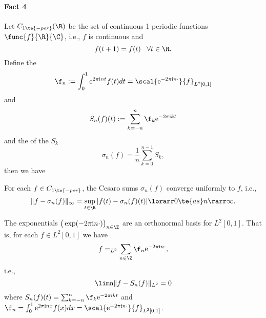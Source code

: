 \paragraph{Fact 4}
Let $C_{1\te{-per}}(\R)$ be the set of continuous 1-periodic functions $\func{f}{\R}{\C}$, i.e., $f$ is continuous and
\[f(t+1)=f(t)\;\;\;\forall t\in \R.\]
Define the 
\[\f_n:=\int_0^1\mathrm{e}^{2\pi \mathrm{i} n t}f(t)dt=\scal{\mathrm{e}^{-2\pi \mathrm{i}n\cdot}}{f}_{L^2[0,1]}\]
and 
\[S_n(f)(t):=\sum_{k=-n}^n\f_k\mathrm{e}^{-2\pi \mathrm{i} kt}\]
and the  of the $S_k$
\[\sigma_n(f)=\frac{1}{n}\sum_{k=0}^{n-1}S_k,\]
then we have
\begin{thm}[Fejér]\label{ii.23}
    For each $f\in C_{1\te{-per}}$, the Cesaro sums $\sigma_n(f)$ converge uniformly to $f$, i.e., 
    \[\|f-\sigma_n(f)\|_\infty=\sup_{t\in\R}|f(t)-\sigma_n(f)(t)|\lorarr0\te{ as }n\rarr\infty.\]
\end{thm}

\begin{thm}\label{ii.24}
    The exponentials $\big(\exp(-2\pi \mathrm{i}n\cdot)\big)_{n\in\Z}$ are an orthonormal basis for $L^2[0,1]$. That is, for each $f\in L^2[0,1]$ we have
    \[f=_{L^2}\sum_{n\in\Z}\f_n\mathrm{e}^{-2\pi  \mathrm{i} n\cdot},\]
    i.e., 
    \[\limn\|f-S_n(f)\|_{L^2}=0\]
    where $S_n(f)(t)=\sum_{k=-n}^n\f_k\mathrm{e}^{-2\pi \mathrm{i} kt}$ and $\f_n=\int_0^1\mathrm{e}^{2\pi \mathrm{i}nx}f(x)dx=\scal{\mathrm{e}^{-2\pi \mathrm{i}n\cdot}}{f}_{L^2[0,1]}$.
\end{thm}